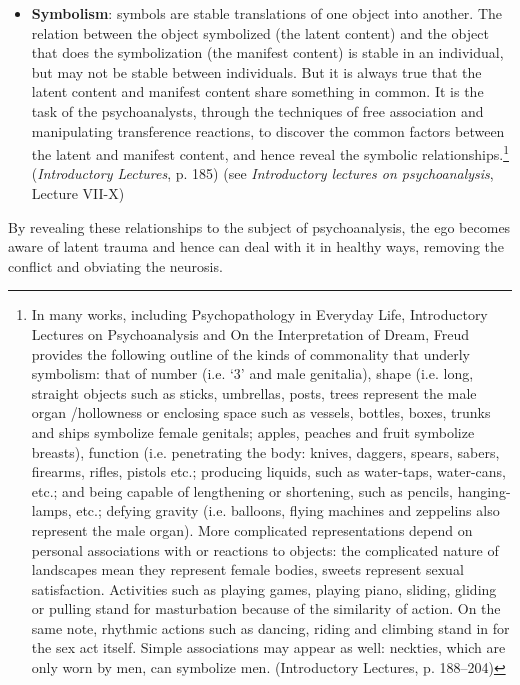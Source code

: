 \begin{refsection}
\begin{itemize}
\item \textbf{Symbolism}: symbols are stable translations of one object into another. The relation between the object symbolized (the latent content) and the object that does the symbolization (the manifest content) is stable in an individual, but may not be stable between individuals. But it is always true that the latent content and manifest content share something in common. It is the task of the psychoanalysts, through the techniques of free association and manipulating transference reactions, to discover the common factors between the latent and manifest content, and hence reveal the symbolic relationships.\footnote{In many works, including Psychopathology in Everyday Life, Introductory Lectures on Psychoanalysis and On the Interpretation of Dream, Freud provides the following outline of the kinds of commonality that underly symbolism: that of number (i.e. `3' and male genitalia), shape (i.e. long, straight objects such as sticks, umbrellas, posts, trees represent the male organ \slash  hollowness or enclosing space such as vessels, bottles, boxes, trunks and ships symbolize female genitals; apples, peaches and fruit symbolize breasts), function (i.e. penetrating the body: knives, daggers, spears, sabers, firearms, rifles, pistols etc.; producing liquids, such as water-taps, water-cans, etc.; and being capable of lengthening or shortening, such as pencils, hanging-lamps, etc.; defying gravity (i.e. balloons, flying machines and zeppelins also represent the male organ). More complicated representations depend on personal associations with or reactions to objects: the complicated nature of landscapes mean they represent female bodies, sweets represent sexual satisfaction. Activities such as playing games, playing piano, sliding, gliding or pulling stand for masturbation because of the similarity of action. On the same note, rhythmic actions such as dancing, riding and climbing stand in for the sex act itself. Simple associations may appear as well: neckties, which are only worn by men, can symbolize men. (Introductory Lectures, p. 188--204)} (\emph{Introductory Lectures}, p. 185)
(see \emph{Introductory lectures on psychoanalysis}, Lecture VII-X)

\end{itemize}

By revealing these relationships to the subject of psychoanalysis, the ego becomes aware of latent trauma and hence can deal with it in healthy ways, removing the conflict and obviating the neurosis.


\end{refsection}
